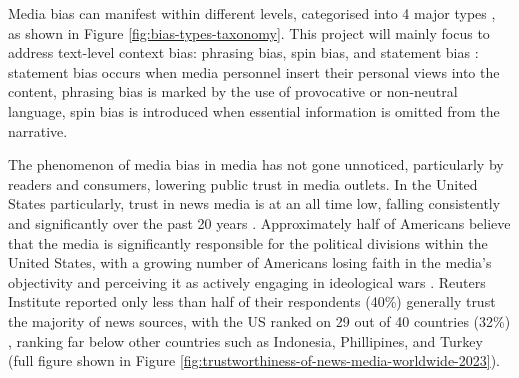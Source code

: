 Media bias can manifest within different levels, categorised into 4 major types \cite{spinde-2024-taxonomy}, as shown in Figure \ref{fig:bias-types-taxonomy}. This project will mainly focus to address text-level context bias: phrasing bias, spin bias, and statement bias \cite{spinde-2024-taxonomy}: statement bias occurs when media personnel insert their personal views into the content, phrasing bias is marked by the use of provocative or non-neutral language, spin bias is introduced when essential information is omitted from the narrative.

The phenomenon of media bias in media has not gone unnoticed, particularly by readers and consumers, lowering public trust in media outlets. In the United States particularly, trust in news media is at an all time low, falling consistently and significantly over the past 20 years \cite{pew-2021-partisan-divides, gallup-knight-2020-american-views, reuters-2023-digital-news-report}. Approximately half of Americans believe that the media is significantly responsible for the political divisions within the United States, with a growing number of Americans losing faith in the media's objectivity and perceiving it as actively engaging in ideological wars \cite{gallup-knight-2020-american-views}. Reuters Institute reported only less than half of their respondents (40\%) generally trust the majority of news sources, with the US ranked on 29 out of 40 countries (32\%) \cite{reuters-2023-digital-news-report,reuters-2023-trust}, ranking far below other countries such as Indonesia, Phillipines, and Turkey (full figure shown in Figure \ref{fig:trustworthiness-of-news-media-worldwide-2023}).

